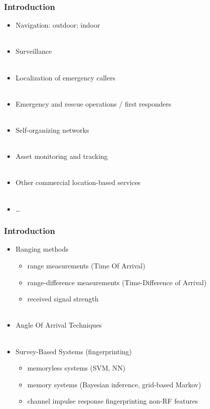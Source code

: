 \documentclass [t] {beamer} %
\begin{document}
\begin{frame} %
\frametitle{Introduction}
\phantom{m}
\begin{itemize}
\item
Navigation: outdoor; indoor
\\~\\
\item
Surveillance
\\~\\
\item
Localization of emergency callers
\\~\\
\item
Emergency and rescue operations / first responders
\\~\\
\item
Self-organizing networks
\\~\\
\item
Asset monitoring and tracking
\\~\\
\item
Other commercial location-based services
\\~\\
\item
\ldots
\end{itemize}
\end{frame}

\begin{frame} %
\frametitle{Introduction}
\phantom{m}
\begin{itemize}
\item
Ranging methods
\begin{itemize}
\item
range measurements (Time Of Arrival)
\item
range-difference measurements (Time-Difference of Arrival)
\item
received signal strength
\\~\\
\end{itemize}

\item
Angle Of Arrival Techniques
\\~\\
\item
Survey-Based Systems (fingerprinting)
\begin{itemize}
\item
memoryless systems (SVM, NN)
\item
memory systems (Bayesian inference, grid-based Markov)
\item
channel impulse response fingerprinting
non-RF features
\end{itemize}
\end{itemize}
\end{frame}
\end{document}
